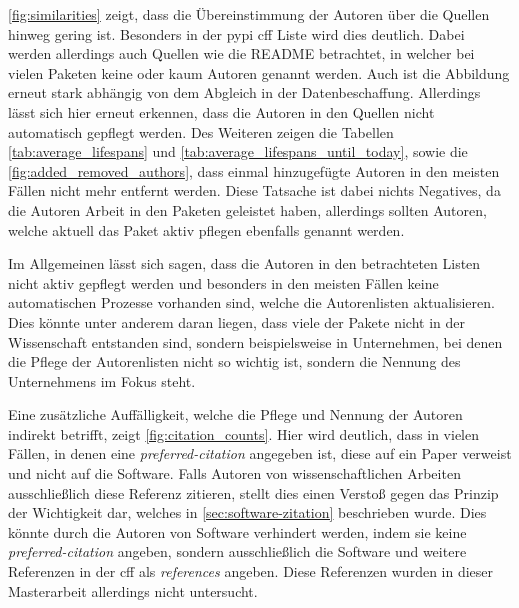 \autoref{fig:similarities} zeigt, dass die Übereinstimmung der Autoren über die Quellen hinweg gering ist.
Besonders in der \gls{pypi} \gls{cff} Liste wird dies deutlich.
Dabei werden allerdings auch Quellen wie die README betrachtet, in welcher bei vielen Paketen keine oder kaum Autoren genannt werden.
Auch ist die Abbildung erneut stark abhängig von dem Abgleich in der Datenbeschaffung.
Allerdings lässt sich hier erneut erkennen, dass die Autoren in den Quellen nicht automatisch gepflegt werden.
Des Weiteren zeigen die Tabellen \ref{tab:average_lifespans} und \ref{tab:average_lifespans_until_today}, sowie die \autoref{fig:added_removed_authors}, dass einmal hinzugefügte Autoren in den meisten Fällen nicht mehr entfernt werden.
Diese Tatsache ist dabei nichts Negatives, da die Autoren Arbeit in den Paketen geleistet haben, allerdings sollten Autoren, welche aktuell das Paket aktiv pflegen ebenfalls genannt werden.

Im Allgemeinen lässt sich sagen, dass die Autoren in den betrachteten Listen nicht aktiv gepflegt werden und besonders in den meisten Fällen keine automatischen Prozesse vorhanden sind, welche die Autorenlisten aktualisieren.
Dies könnte unter anderem daran liegen, dass viele der Pakete nicht in der Wissenschaft entstanden sind, sondern beispielsweise in Unternehmen, bei denen die Pflege der Autorenlisten nicht so wichtig ist, sondern die Nennung des Unternehmens im Fokus steht.

Eine zusätzliche Auffälligkeit, welche die Pflege und Nennung der Autoren indirekt betrifft, zeigt \autoref{fig:citation_counts}.
Hier wird deutlich, dass in vielen Fällen, in denen eine \emph{preferred-citation} angegeben ist, diese auf ein Paper verweist und nicht auf die Software.
Falls Autoren von wissenschaftlichen Arbeiten ausschließlich diese Referenz zitieren, stellt dies einen Verstoß gegen das Prinzip der Wichtigkeit dar, welches in \autoref{sec:software-zitation} beschrieben wurde.
Dies könnte durch die Autoren von Software verhindert werden, indem sie keine \emph{preferred-citation} angeben, sondern ausschließlich die Software und weitere Referenzen in der \gls{cff} als \emph{references} angeben.
Diese Referenzen wurden in dieser Masterarbeit allerdings nicht untersucht.

